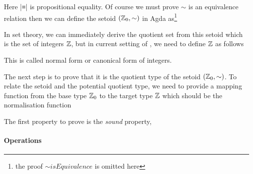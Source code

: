 


Here |≡| is propositional equality. Of course we must prove $\sim$ is an
equivalence relation then we can define the setoid $(\mathbb{Z}_0,\sim)$ in
Agda as\footnote{the proof $\sim isEquivalence$ is omitted here}




In set theory, we can immediately derive the quotient set from this
setoid which is the set of integers $\mathbb{Z}$, but in current setting of \itt,
we need to define $\mathbb{Z}$ as follows




This is called normal form or canonical form of integers.

The next step is to prove that it is the quotient type of the setoid $(\mathbb{Z}_0,\sim)$.
To relate the setoid and the potential quotient type, we need to
provide a mapping function from the base type $\mathbb{Z}_0$ to the target
type $\mathbb{Z}$ which should be the normalisation function




The first property to prove is the \emph{sound} property,





\paragraph{Operations}

